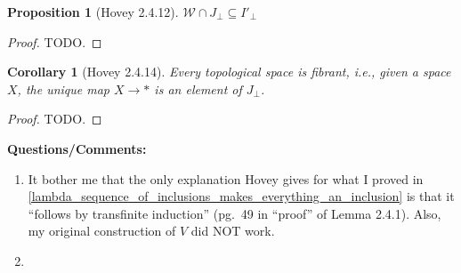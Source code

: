 \documentclass{amsart}
\theoremstyle{plain}
\newtheorem{corollary}[theorem]{Corollary}
\newtheorem{proposition}[theorem]{Proposition}
\theoremstyle{definition}
\newcommand{\sseq}{\subseteq}
\newcommand{\0}{\mathbf{0}}
\newcommand{\p}{{_\perp}}
\newcommand{\cW}{\mathcal W}
\renewcommand{\(}{\left(}
\renewcommand{\)}{\right)}
\begin{document}
\begin{proposition}[Hovey 2.4.12]\label{2.4.12}
  $\cW\cap J\p\sseq I'\p $
\end{proposition}
\begin{proof}
  \color{red}TODO.
\end{proof}

\begin{corollary}[Hovey 2.4.14]\label{2.4.14}
  Every topological space is fibrant, i.e., given a space $X$, the unique map $X\to\ast$ is an element of $J\p$.
\end{corollary}
\begin{proof}
  \color{red}TODO.
\end{proof}

\textbf{Questions/Comments:}\begin{enumerate}
  \item It bother me that the only explanation Hovey gives for what I proved in \autoref{lambda_sequence_of_inclusions_makes_everything_an_inclusion} is that it ``follows by transfinite induction'' (pg.\ 49 in ``proof'' of Lemma 2.4.1). Also, my original construction of $V$ did NOT work.
  \item 
\end{enumerate}
\end{document}
